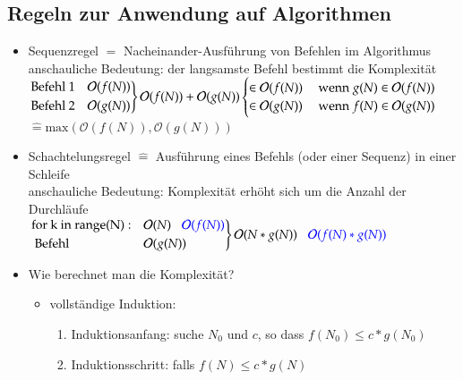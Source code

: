 \documentclass[11pt, fleqn]{scrreprt}
\begin{document}
\subsection*{Regeln zur Anwendung auf Algorithmen}
\begin{itemize}
	\item Sequenzregel $\widehat{=}$ Nacheinander-Ausführung von Befehlen im Algorithmus \\
	anschauliche Bedeutung: der langsamste Befehl bestimmt die Komplexität \\
	$\begin{rcases}
	\text{Befehl 1} & \mathcal{O}(f(N)) \\
	\text{Befehl 2} & \mathcal{O}(g(N))\\ \end{rcases} \mathcal{O}(f(N)) + \mathcal{O}(g(N)) \begin{cases}
	\in \mathcal{O}(f(N)) & \text{ wenn } g(N) \in \mathcal{O}(f(N)) \\
	\in \mathcal{O}(g(N)) & \text{ wenn } f(N) \in \mathcal{O}(g(N)) \\ \end{cases}$ \\
	\hspace*{6.5cm} $\widehat{=} \text{max}(\mathcal{O}(f(N)), \mathcal{O}(g(N)))$
	\item Schachtelungsregel $\widehat{=}$ Ausführung eines Befehls (oder einer Sequenz) in einer Schleife \\
	anschauliche Bedeutung: Komplexität erhöht sich um die Anzahl der Durchläufe \\
	$\begin{rcases}
	\text{for k in range(N)}: & \mathcal{O}(N)\hspace*{3mm} \textcolor{blue}{\mathcal{O}(f(N))}\\
		\text{  Befehl} & \mathcal{O}(g(N)) \end{rcases}\mathcal{O}(N*g(N)) \hspace*{3mm} \textcolor{blue}{\mathcal{O}(f(N)*g(N))}$
		\item Wie berechnet man die Komplexität?
		\begin{itemize}
			\item vollständige Induktion: 
			\begin{enumerate}
				\item Induktionsanfang: suche $N_0$ und $c$, so dass $f(N_0) \leq c*g(N_0)$
				\item Induktionsschritt: falls $f(N) \leq c*g(N)$ \\

\end{enumerate}
\end{itemize}
\end{itemize}
\end{document}
